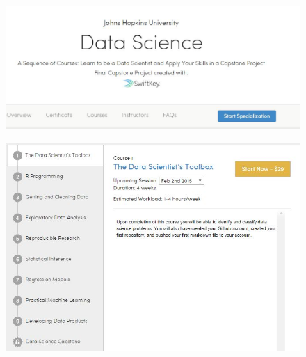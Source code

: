\documentclass{beamer}
\begin{document}
\begin{frame}
	\begin{figure}
		\centering
		\includegraphics[width=1.11\linewidth]{dss1}
		
	\end{figure}
	
\end{frame}
\begin{frame}
	\begin{figure}
		\centering
		\includegraphics[width=1.11\linewidth]{dss2}
		
	\end{figure}
	
\end{frame}
\end{document}
